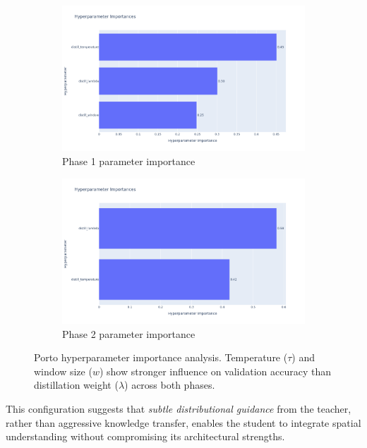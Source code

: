 \begin{figure}[t]
    \centering
    \begin{subfigure}{0.49\linewidth}
        \centering
        \includegraphics[width=\linewidth]{assets/plots/eval/porto/optuna/phase1/param_importance.pdf}
        \caption{Phase 1 parameter importance}
    \end{subfigure}
    \begin{subfigure}{0.49\linewidth}
        \centering
        \includegraphics[width=\linewidth]{assets/plots/eval/porto/optuna/phase2/param_importance.pdf}
        \caption{Phase 2 parameter importance}
    \end{subfigure}
    \caption{Porto hyperparameter importance analysis. Temperature ($\tau$) and window size ($w$) show stronger influence on validation accuracy than distillation weight ($\lambda$) across both phases.}
    \label{fig:porto-optuna-importance}
\end{figure}

This configuration suggests that \emph{subtle distributional guidance} from the teacher, rather than aggressive knowledge transfer, enables the student to integrate spatial understanding without compromising its architectural strengths.

